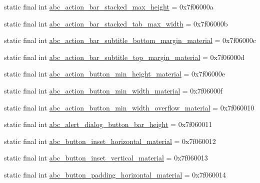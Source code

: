 \begin{DoxyCompactItemize}
\item 
static final int \mbox{\hyperlink{classcom_1_1google_1_1android_1_1gms_1_1R_1_1dimen_a74d0e5c0c5c201687cf064d97dd50817}{abc\+\_\+action\+\_\+bar\+\_\+stacked\+\_\+max\+\_\+height}} = 0x7f06000a
\item 
static final int \mbox{\hyperlink{classcom_1_1google_1_1android_1_1gms_1_1R_1_1dimen_a5feab02132d6abfc90e995cc2bbbf597}{abc\+\_\+action\+\_\+bar\+\_\+stacked\+\_\+tab\+\_\+max\+\_\+width}} = 0x7f06000b
\item 
static final int \mbox{\hyperlink{classcom_1_1google_1_1android_1_1gms_1_1R_1_1dimen_a605157d42fa8ccf6e71a5fc6549be678}{abc\+\_\+action\+\_\+bar\+\_\+subtitle\+\_\+bottom\+\_\+margin\+\_\+material}} = 0x7f06000c
\item 
static final int \mbox{\hyperlink{classcom_1_1google_1_1android_1_1gms_1_1R_1_1dimen_af70a0d29fdc04af5627ef508b78f8d29}{abc\+\_\+action\+\_\+bar\+\_\+subtitle\+\_\+top\+\_\+margin\+\_\+material}} = 0x7f06000d
\item 
static final int \mbox{\hyperlink{classcom_1_1google_1_1android_1_1gms_1_1R_1_1dimen_a242226aeb45d1881a78ea7f7d8cdba58}{abc\+\_\+action\+\_\+button\+\_\+min\+\_\+height\+\_\+material}} = 0x7f06000e
\item 
static final int \mbox{\hyperlink{classcom_1_1google_1_1android_1_1gms_1_1R_1_1dimen_aba7900699809b88c52484c54191e25ea}{abc\+\_\+action\+\_\+button\+\_\+min\+\_\+width\+\_\+material}} = 0x7f06000f
\item 
static final int \mbox{\hyperlink{classcom_1_1google_1_1android_1_1gms_1_1R_1_1dimen_a1cd4b43c8b25faa47b826a7e30a8ad26}{abc\+\_\+action\+\_\+button\+\_\+min\+\_\+width\+\_\+overflow\+\_\+material}} = 0x7f060010
\item 
static final int \mbox{\hyperlink{classcom_1_1google_1_1android_1_1gms_1_1R_1_1dimen_ab07a60dc744b9ce7d7ff9fff17f701aa}{abc\+\_\+alert\+\_\+dialog\+\_\+button\+\_\+bar\+\_\+height}} = 0x7f060011
\item 
static final int \mbox{\hyperlink{classcom_1_1google_1_1android_1_1gms_1_1R_1_1dimen_aebaad58a32bb4e82dc46540bfc084ee7}{abc\+\_\+button\+\_\+inset\+\_\+horizontal\+\_\+material}} = 0x7f060012
\item 
static final int \mbox{\hyperlink{classcom_1_1google_1_1android_1_1gms_1_1R_1_1dimen_a937fd68f29bf590436ac0b2df3f85c95}{abc\+\_\+button\+\_\+inset\+\_\+vertical\+\_\+material}} = 0x7f060013
\item 
static final int \mbox{\hyperlink{classcom_1_1google_1_1android_1_1gms_1_1R_1_1dimen_ac2bfd879659f76651cb4a23f469d280f}{abc\+\_\+button\+\_\+padding\+\_\+horizontal\+\_\+material}} = 0x7f060014

\end{DoxyCompactItemize}

